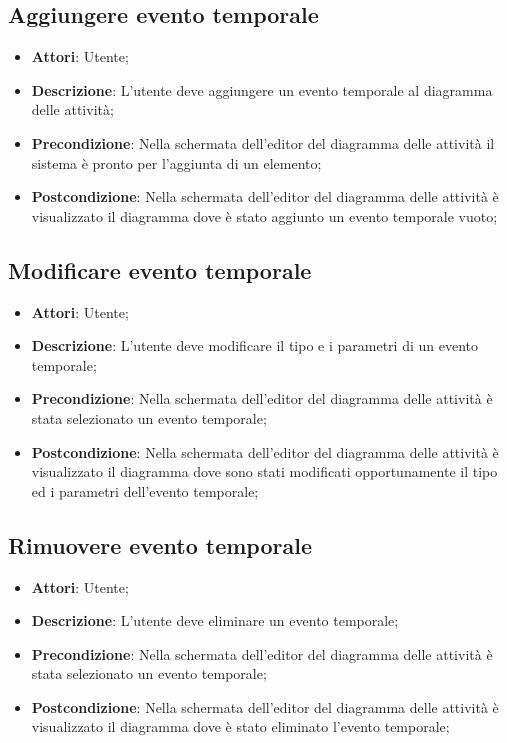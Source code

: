 \documentclass[../AnalisiDeiRequisiti.tex]{subfiles}
\begin{document}
	\subsection{Aggiungere evento temporale}
	\begin{itemize}
		\item \textbf{Attori}: Utente;
		\item \textbf{Descrizione}: L'utente deve aggiungere un evento temporale al diagramma delle attività;
		\item \textbf{Precondizione}: Nella schermata dell'editor del diagramma delle attività il sistema è pronto per l'aggiunta di un elemento;
		\item \textbf{Postcondizione}: Nella schermata dell'editor del diagramma delle attività è visualizzato il diagramma dove è stato aggiunto un evento temporale vuoto;
	\end{itemize}
	
	\subsection{Modificare evento temporale}
	\begin{itemize}
		\item \textbf{Attori}: Utente;
		\item \textbf{Descrizione}: L'utente deve modificare il tipo e i parametri di un evento temporale;
		\item \textbf{Precondizione}: Nella schermata dell'editor del diagramma delle attività è stata selezionato un evento temporale;
		\item \textbf{Postcondizione}: Nella schermata dell'editor del diagramma delle attività è visualizzato il diagramma dove sono stati modificati opportunamente il tipo ed i parametri dell'evento temporale;
	\end{itemize}
	
	\subsection{Rimuovere evento temporale}
	\begin{itemize}
		\item \textbf{Attori}: Utente;
		\item \textbf{Descrizione}: L'utente deve eliminare un evento temporale;
		\item \textbf{Precondizione}: Nella schermata dell'editor del diagramma delle attività è stata selezionato un evento temporale;
		\item \textbf{Postcondizione}: Nella schermata dell'editor del diagramma delle attività è visualizzato il diagramma dove è stato eliminato l'evento temporale;
	\end{itemize}
\end{document}
